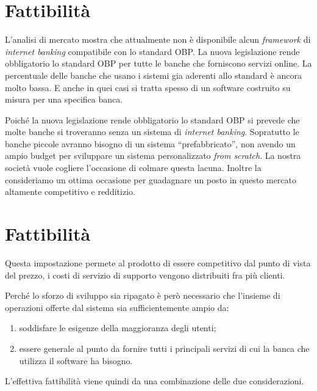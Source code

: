 \documentclass[10pt]{softeng} %
\begin{document}

\section{Fattibilit\`a}

L'analisi di mercato mostra che attualmente non \`e disponibile alcun \emph{framework} di \emph{internet banking} compatibile con lo standard OBP.
La nuova legislazione rende obbligatorio lo standard OBP per tutte le banche che forniscono servizi online.
La percentuale delle banche che usano i sistemi gia aderenti allo standard \`e ancora molto bassa.
E anche in quei casi si tratta spesso di un software costruito su misura per una specifica banca.

Poich\'e la nuova legislazione rende obbligatorio lo standard OBP si prevede che molte banche si troveranno senza un sistema di \emph{internet banking}.
Sopratutto le banche piccole avranno bisogno di un sistema ``prefabbricato'', non avendo un ampio budget per sviluppare un sistema personalizzato \emph{from scratch}.
La nostra societ\`a vuole cogliere l'occasione di colmare questa lacuna.
Inoltre la consideriamo un ottima occasione per guadagnare un posto in questo mercato altamente competitivo e redditizio.

\section{Fattibilit\`a}




Questa impostazione permete al prodotto di essere competitivo dal punto di vista del prezzo, i costi di servizio di supporto vengono distribuiti fra pi\`u clienti. 


Perch\'e lo sforzo di sviluppo sia ripagato \`e per\`o necessario che l'insieme di operazioni offerte dal sistema sia sufficientemente ampio da:
\begin{enumerate}
	\item soddisfare le esigenze della maggioranza degli utenti;
	\item essere generale al punto da fornire tutti i principali servizi di cui la banca che utilizza il software ha bisogno.
\end{enumerate}
L'effettiva fattibilit\`a viene quindi da una combinazione delle due considerazioni.
\end{document}
